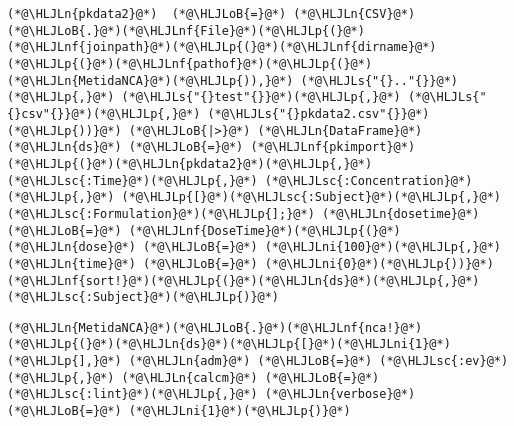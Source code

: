 \documentclass[12pt,a4paper]{article}
\newcommand{\HLJLn}[1]{#1}
\newcommand{\HLJLnf}[1]{\textcolor[RGB]{66,102,213}{#1}}
\newcommand{\HLJLs}[1]{\textcolor[RGB]{201,61,57}{#1}}
\newcommand{\HLJLsc}[1]{\textcolor[RGB]{201,61,57}{#1}}
\newcommand{\HLJLni}[1]{\textcolor[RGB]{59,151,46}{#1}}
\newcommand{\HLJLoB}[1]{\textcolor[RGB]{102,102,102}{\textbf{#1}}}
\newcommand{\HLJLp}[1]{#1}
\begin{document}
\begin{lstlisting}
(*@\HLJLn{pkdata2}@*)  (*@\HLJLoB{=}@*) (*@\HLJLn{CSV}@*)(*@\HLJLoB{.}@*)(*@\HLJLnf{File}@*)(*@\HLJLp{(}@*)(*@\HLJLnf{joinpath}@*)(*@\HLJLp{(}@*)(*@\HLJLnf{dirname}@*)(*@\HLJLp{(}@*)(*@\HLJLnf{pathof}@*)(*@\HLJLp{(}@*)(*@\HLJLn{MetidaNCA}@*)(*@\HLJLp{)),}@*) (*@\HLJLs{"{}.."{}}@*)(*@\HLJLp{,}@*) (*@\HLJLs{"{}test"{}}@*)(*@\HLJLp{,}@*) (*@\HLJLs{"{}csv"{}}@*)(*@\HLJLp{,}@*) (*@\HLJLs{"{}pkdata2.csv"{}}@*)(*@\HLJLp{))}@*) (*@\HLJLoB{|>}@*) (*@\HLJLn{DataFrame}@*)
(*@\HLJLn{ds}@*) (*@\HLJLoB{=}@*) (*@\HLJLnf{pkimport}@*)(*@\HLJLp{(}@*)(*@\HLJLn{pkdata2}@*)(*@\HLJLp{,}@*) (*@\HLJLsc{:Time}@*)(*@\HLJLp{,}@*) (*@\HLJLsc{:Concentration}@*)(*@\HLJLp{,}@*) (*@\HLJLp{[}@*)(*@\HLJLsc{:Subject}@*)(*@\HLJLp{,}@*) (*@\HLJLsc{:Formulation}@*)(*@\HLJLp{];}@*) (*@\HLJLn{dosetime}@*) (*@\HLJLoB{=}@*) (*@\HLJLnf{DoseTime}@*)(*@\HLJLp{(}@*)(*@\HLJLn{dose}@*) (*@\HLJLoB{=}@*) (*@\HLJLni{100}@*)(*@\HLJLp{,}@*) (*@\HLJLn{time}@*) (*@\HLJLoB{=}@*) (*@\HLJLni{0}@*)(*@\HLJLp{))}@*)
(*@\HLJLnf{sort!}@*)(*@\HLJLp{(}@*)(*@\HLJLn{ds}@*)(*@\HLJLp{,}@*) (*@\HLJLsc{:Subject}@*)(*@\HLJLp{)}@*)
\end{lstlisting}

\begin{lstlisting}
(*@\HLJLn{MetidaNCA}@*)(*@\HLJLoB{.}@*)(*@\HLJLnf{nca!}@*)(*@\HLJLp{(}@*)(*@\HLJLn{ds}@*)(*@\HLJLp{[}@*)(*@\HLJLni{1}@*)(*@\HLJLp{],}@*) (*@\HLJLn{adm}@*) (*@\HLJLoB{=}@*) (*@\HLJLsc{:ev}@*)(*@\HLJLp{,}@*) (*@\HLJLn{calcm}@*) (*@\HLJLoB{=}@*) (*@\HLJLsc{:lint}@*)(*@\HLJLp{,}@*) (*@\HLJLn{verbose}@*) (*@\HLJLoB{=}@*) (*@\HLJLni{1}@*)(*@\HLJLp{)}@*)
\end{lstlisting}
\end{document}
